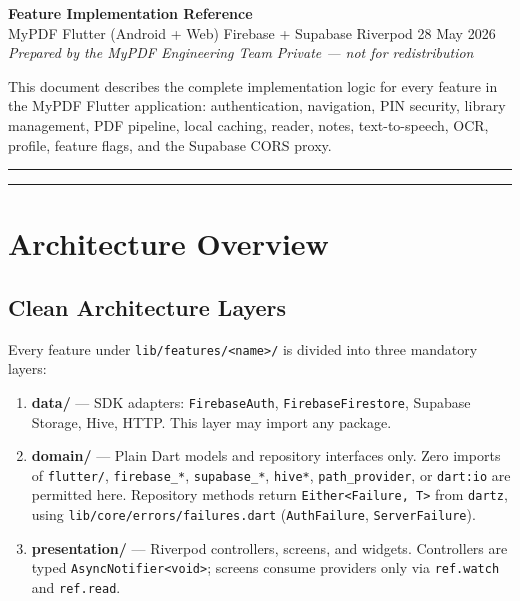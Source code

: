 \documentclass[11pt,a4paper]{article}
\begin{document}
\thispagestyle{fancy}
\begin{center}
  {\LARGE\bfseries\color{accent} Feature Implementation Reference}\\[6pt]
  {\normalsize MyPDF \textbullet{} Flutter (Android + Web) \textbullet{}
   Firebase + Supabase \textbullet{} Riverpod \textbullet{} 28 May 2026}\\[4pt]
  {\small\itshape Prepared by the MyPDF Engineering Team \textbullet{}
   Private --- not for redistribution}
\end{center}
\vspace{2pt}
{\small This document describes the complete implementation logic for every feature in
the MyPDF Flutter application: authentication, navigation, PIN security, library
management, PDF pipeline, local caching, reader, notes, text-to-speech, OCR,
profile, feature flags, and the Supabase CORS proxy.}
\vspace{8pt}
\hrule
\vspace{4pt}

\tableofcontents
\vspace{6pt}
\hrule

\section{Architecture Overview}

\subsection{Clean Architecture Layers}

Every feature under \texttt{lib/features/<name>/} is divided into three mandatory layers:

\begin{enumerate}
  \item \textbf{data/} --- SDK adapters: \texttt{FirebaseAuth}, \texttt{FirebaseFirestore},
    Supabase Storage, Hive, HTTP. This layer may import any package.
  \item \textbf{domain/} --- Plain Dart models and repository interfaces only.
    Zero imports of \texttt{flutter/}, \texttt{firebase\_*}, \texttt{supabase\_*},
    \texttt{hive*}, \texttt{path\_provider}, or \texttt{dart:io} are permitted here.
    Repository methods return \texttt{Either<Failure,\,T>} from \texttt{dartz}, using
    \texttt{lib/core/errors/failures.dart} (\texttt{AuthFailure}, \texttt{ServerFailure}).
  \item \textbf{presentation/} --- Riverpod controllers, screens, and widgets.
    Controllers are typed \texttt{AsyncNotifier<void>}; screens consume providers only
    via \texttt{ref.watch} and \texttt{ref.read}.
\end{enumerate}
\end{document}
